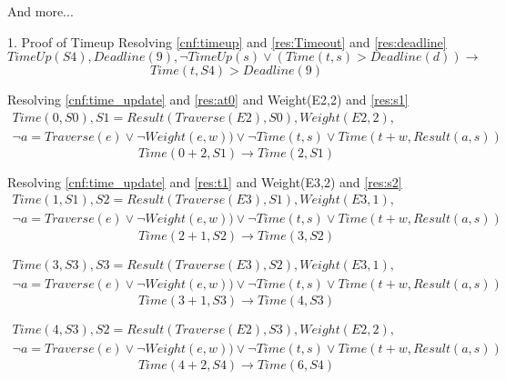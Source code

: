 \documentclass{article}                     %
\begin{document}
	And more...
	
	1. Proof of Timeup
	Resolving \ref{cnf:timeup} and \ref{res:Timeout} and \ref{res:deadline}
	\begin{equation}\label{cnf:timeout}
	TimeUp(S4), Deadline(9), \neg TimeUp(s) \lor (Time(t, s) > Deadline(d)) \rightarrow
	\end{equation}
	$$ Time(t, S4) > Deadline(9) $$
	
	Resolving \ref{cnf:time_update} and \ref{res:at0} and Weight(E2,2) and \ref{res:s1}
	\begin{equation}\label{res:t1}
	\begin{split}
	Time(0, S0), S1 = Result(Traverse(E2), S0), Weight(E2,2), \\
	 \neg a=Traverse(e) \lor \neg Weight(e, w)) \lor \neg Time(t, s)
	\lor 
	Time(t+w, Result(a, s))
	\end{split}
	\end{equation}
	$$ Time(0+2, S1) \rightarrow Time(2, S1) $$
	
	Resolving \ref{cnf:time_update} and \ref{res:t1} and Weight(E3,2) and \ref{res:s2}
	\begin{equation}\label{key}
	\begin{split}
	Time(1, S1), S2 = Result(Traverse(E3), S1), Weight(E3,1),  \\
	\neg a=Traverse(e) \lor \neg Weight(e, w)) \lor \neg Time(t, s)
	\lor 
	Time(t+w, Result(a, s))
	\end{split}
	\end{equation}	
	$$ Time(2+1, S2) \rightarrow Time(3, S2) $$	

	\begin{equation}\label{key}
	\begin{split}
	Time(3, S3), S3 = Result(Traverse(E3), S2), Weight(E3,1),  \\
	\neg a=Traverse(e) \lor \neg Weight(e, w)) \lor \neg Time(t, s)
	\lor 
	Time(t+w, Result(a, s))
	\end{split}
	\end{equation}	
	$$ Time(3+1, S3) \rightarrow Time(4, S3) $$	

	\begin{equation}\label{key}
	\begin{split}
	Time(4, S3), S2 = Result(Traverse(E2), S3), Weight(E2,2),  \\
	\neg a=Traverse(e) \lor \neg Weight(e, w)) \lor \neg Time(t, s)
	\lor 
	Time(t+w, Result(a, s))
	\end{split}
	\end{equation}	
	$$ Time(4+2, S4) \rightarrow Time(6, S4) $$	
	
\end{document}
